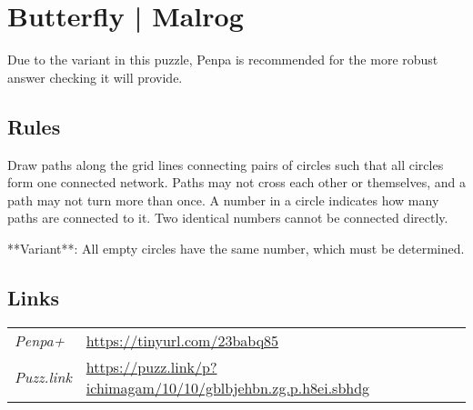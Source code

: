 \section{Butterfly | {\normalfont Malrog}}
\label{sec:22-butterfly-malrog}
Due to the variant in this puzzle, Penpa is recommended for the more robust answer checking it will provide.
\subsection*{Rules}
\begin{markdown}
Draw paths along the grid lines connecting pairs of circles such that all circles form one connected network. Paths may not cross each other or themselves, and a path may not turn more than once. A number in a circle indicates how many paths are connected to it. Two identical numbers cannot be connected directly.

**Variant**: All empty circles have the same number, which must be determined.
\end{markdown}
\subsection*{Links}
\begin{tabularx}{\textwidth}{l X}
\emph{Penpa+} & \url{https://tinyurl.com/23babq85} \\
\emph{Puzz.link} & \url{https://puzz.link/p?ichimagam/10/10/gblbjehbn.zg.p.h8ei.sbhdg} \\
\end{tabularx}
\pagebreak
